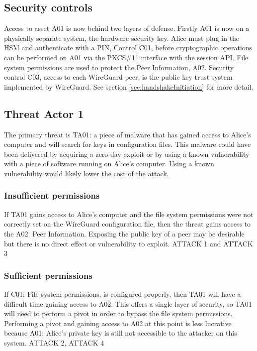 \documentclass [11pt, proquest] {uwthesis}[2020/02/24]
\begin{document}
\subsection{Security controls}
Access to asset A01 is now behind two layers of defense. Firstly A01 is now on a physically separate system, the hardware security key. Alice must plug in the HSM and authenticate with a PIN, Control C01, before cryptographic operations can be performed on A01 via the PKCS\#11 interface with the session API.
File system permissions are used to protect the Peer Information, A02.
Security control C03, access to each WireGuard peer, is the public key trust system implemented by WireGuard. See section \ref{sec:handshakeInitiation} for more detail.

\subsection{Threat Actor 1}
The primary threat is TA01: a piece of malware that has gained access to Alice's computer and will search for keys in configuration files. This malware could have been delivered by acquiring a zero-day exploit or by using a known vulnerability with a piece of software running on Alice's computer. Using a known vulnerability would likely lower the cost of the attack.

\subsubsection{Insufficient permissions}
If TA01 gains access to Alice's computer and the file system permissions were not correctly set on the WireGuard configuration file, then the threat gains access to the A02: Peer Information. Exposing the public key of a peer may be desirable but there is no direct effect or vulnerability to exploit.
ATTACK 1 and ATTACK 3

\subsubsection{Sufficient permissions}
If C01: File system permissions, is configured properly, then TA01 will have a difficult time gaining access to A02. This offers a single layer of security, so TA01 will need to perform a pivot in order to bypass the file system permissions. Performing a pivot and gaining access to A02 at this point is less lucrative because A01: Alice's private key is still not accessible to the attacker on this system.
ATTACK 2, ATTACK 4
\end{document}
